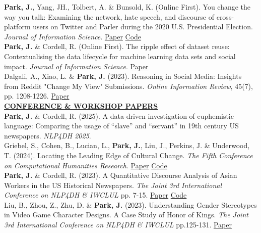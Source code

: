 \documentclass{article}
\begin{document}
\noindent \textbf{Park, J.}, Yang, JH., Tolbert, A. \& Bunsold, K. (Online First). You change the way you talk: Examining the network, hate speech, and discourse of cross-platform users on Twitter and Parler during the 2020 U.S. Presidential Election. \textit{Journal of Information Science}. \hfill \href{https://journals.sagepub.com/doi/abs/10.1177/01655515241238405}{Paper} \href{https://github.com/park-jay/cross-platform}{Code} \\ 

\noindent \textbf{Park, J.} \& Cordell, R. (Online First). The ripple effect of dataset reuse: Contextualising the data lifecycle for machine learning data sets and social impact. \textit{Journal of Information Science}. \hfill \href{https://journals.sagepub.com/doi/abs/10.1177/01655515231212977}{Paper} \\

\noindent Dalgali, A., Xiao, L. \& \textbf{Park, J.} (2023). Reasoning in Social Media: Insights from Reddit "Change My View" Submissions. \textit{Online Information Review}, 45(7), pp. 1208-1226. \hfill \href{https://www.emerald.com/insight/content/doi/10.1108/OIR-08-2020-0330/full/html}{Paper} \\

\noindent \textbf{\underline{CONFERENCE \& WORKSHOP PAPERS}} \\ 
\noindent \textbf{Park, J.} \& Cordell, R. (2025). A data-driven investigation of euphemistic language: Comparing the usage of ``slave'' and ``servant'' in 19th century US newspapers. \textit{NLP4DH 2025}. \\

\noindent Griebel, S., Cohen, B., Lucian, L., \textbf{Park, J.}, Liu, J., Perkins, J. \& Underwood, T. (2024). Locating the Leading Edge of Cultural Change. \textit{The Fifth Conference on Computational Humanities Research}. \hfill \href{https://arxiv.org/pdf/2411.15068}{Paper} \href{https://github.com/IllinoisLiteraryLab/novelty}{Code} \\

\noindent \textbf{Park, J.} \& Cordell, R. (2023). A Quantitative Discourse Analysis of Asian Workers in the US Historical Newspapers. \textit{The Joint 3rd International Conference on NLP4DH \& IWCLUL} pp. 7-15. \hfill \href{https://aclanthology.org/2023.nlp4dh-1.2/}{Paper} \href{https://github.com/park-jay/coolie}{Code}\\

\noindent Liu, B., Zhou, Z., Zhu, D. \& \textbf{Park, J.} (2023). Understanding Gender Stereotypes in Video Game Character Designs. A Case Study of Honor of Kings. \textit{The Joint 3rd International Conference on NLP4DH \& IWCLUL} pp.125-131. \hfill \href{https://arxiv.org/pdf/2311.14226}{Paper} \\
\end{document}
